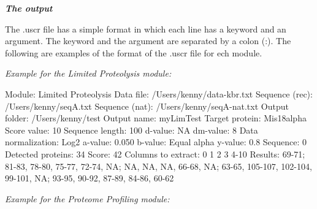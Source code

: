 \textit{\textbf{The output}}

The .uscr file has a simple format in which each line has a keyword and an argument. The keyword and the argument are separated by a colon (:). The following are examples of the format of the .uscr file for ech module.\newline

\textit{Example for the Limited Proteolysis module:}

Module: Limited Proteolysis\newline
Data file: /Users/kenny/data-kbr.txt\newline
Sequence (rec): /Users/kenny/seqA.txt\newline
Sequence (nat): /Users/kenny/seqA-nat.txt\newline
Output folder: /Users/kenny/test\newline
Output name: myLimTest\newline
Target protein: Mis18alpha\newline
Score value: 10\newline
Sequence length: 100\newline
d-value: NA\newline
dm-value: 8\newline
Data normalization: Log2\newline
a-value: 0.050\newline
b-value: Equal alpha\newline
y-value: 0.8\newline
Sequence: 0\newline
Detected proteins: 34\newline
Score: 42\newline
Columns to extract: 0 1 2 3 4-10\newline
Results: 69-71; 81-83, 78-80, 75-77, 72-74, NA; NA, NA, NA, 66-68, NA; 63-65, 105-107, 102-104, 99-101, NA; 93-95, 90-92, 87-89, 84-86, 60-62\newline

\textit{Example for the Proteome Profiling module:}

